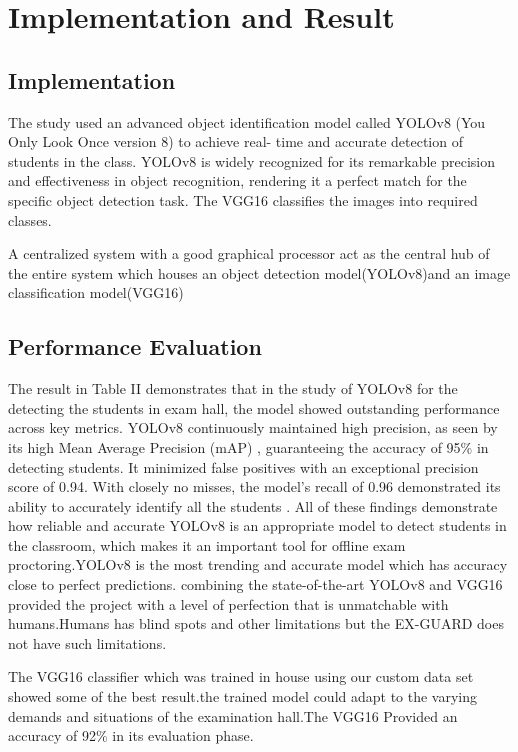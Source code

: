 \documentclass[conference]{IEEEtran}
\begin{document}
\section{Implementation and Result}
\subsection{Implementation}
The study used an advanced object identification model called YOLOv8 (You Only Look Once version 8) to achieve real- time and accurate detection of students in the class. YOLOv8 is widely recognized for its remarkable precision and effectiveness in object recognition, rendering it a perfect match for the specific object detection task. The VGG16 classifies the images into required classes.

A centralized system with a good graphical processor act as the central hub of the entire system which houses an object detection model(YOLOv8)and an image classification model(VGG16)

\subsection{Performance Evaluation}
The result in Table II demonstrates that in the study of YOLOv8 for the detecting the students in exam hall, the model showed outstanding performance across key metrics.
YOLOv8 continuously maintained high precision, as seen by its high Mean Average Precision (mAP) , guaranteeing the accuracy of 95\% in detecting students. It minimized false positives with an exceptional precision score of 0.94. With closely no misses, the model’s recall of 0.96 demonstrated its ability to accurately identify all the  students .
All of these findings demonstrate how reliable and accurate YOLOv8 is an appropriate model to detect students in the classroom, which makes it an important tool for offline exam proctoring.YOLOv8 is the most trending and accurate model which has accuracy close to perfect predictions. combining the state-of-the-art YOLOv8 and VGG16 provided the project with a level of perfection that is unmatchable with humans.Humans has blind spots and other limitations but the EX-GUARD does not have such limitations.

The VGG16 classifier which was trained in house using our custom data set showed some of the best result.the trained model could adapt to the varying demands and situations of the examination hall.The VGG16 Provided an accuracy of 92\% in its evaluation phase.
\end{document}
